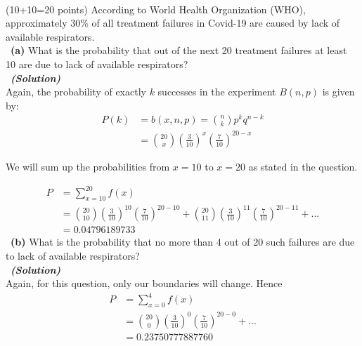 \documentclass[a4 paper]{article}
\numberwithin{equation}{section}
\newcommand{\problem}[2]{~\\\fbox{\textbf{Problem #1}}\hfill (#2 points)\newline\newline}
\newcommand{\subproblem}[1]{~\newline\textbf{(#1)}}
\newcommand{\solution}{~\newline\textbf{\textit{(Solution)}} }
\newcommand{\0}{\mathbf{0}}
\begin{document}
\problem{4:}{10+10=20}
According to World Health Organization (WHO), approximately 30\% of all treatment failures in Covid-19 are caused by lack of available respirators.\\
\subproblem{a} What is the probability that out of the next 20 treatment failures at least 10 are due to lack of available respirators?\\
\solution \\
Again, the probability of exactly $k$ successes in the experiment $B ( n , p )$  is given by: 
\begin{align*}
    P(k) &= b(x, n, p) = \binom{n}{k} p^k q^{n-k} \\
    &= \binom{20}{x}(\frac{3}{10})^x(\frac{7}{10})^{20-x}
\end{align*}{}

We will sum up the probabilities from $x = 10$ to $x = 20$ as stated in the question.

\begin{align*}
    P &= \sum_{x=10}^{20} f(x) \\
    &= \binom{20}{10}(\frac{3}{10})^10(\frac{7}{10})^{20-10} + \binom{20}{11}(\frac{3}{10})^11(\frac{7}{10})^{20-11}  + ... \\
    &= 0.04796189733
\end{align*}{}
\newline
\subproblem{b} What is the probability that no more than 4 out of 20 such failures are due to lack of available respirators?\\
\solution \\
Again, for this question, only our boundaries will change. Hence
\begin{align*}
    P &= \sum_{x=0}^{4} f(x) \\
    &= \binom{20}{0}(\frac{3}{10})^0(\frac{7}{10})^{20-0}  + ... \\
    &= 0.23750777887760
\end{align*}{}
\end{document}
